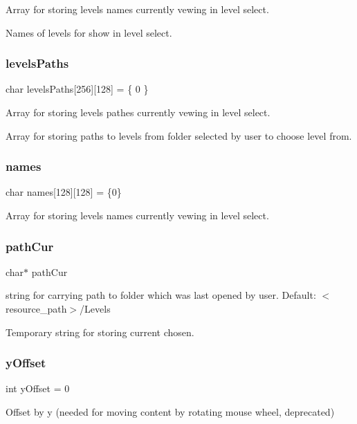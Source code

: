 Array for storing levels names currently vewing in level select. 

Names of levels for show in level select. \mbox{\label{group___main_ga5a00f62db43aff74971290ceba5fa7df}} 
\subsubsection{\texorpdfstring{levels\+Paths}{levelsPaths}}
{\footnotesize\ttfamily char levels\+Paths\mbox{[}256\mbox{]}\mbox{[}128\mbox{]} = \{ 0 \}}



Array for storing levels pathes currently vewing in level select. 

Array for storing paths to levels from folder selected by user to choose level from. \mbox{\label{group___main_ga6341080327d9c3d3ef08fdccd4f05262}} 
\subsubsection{\texorpdfstring{names}{names}}
{\footnotesize\ttfamily char names\mbox{[}128\mbox{]}\mbox{[}128\mbox{]} = \{0\}}



Array for storing levels names currently vewing in level select. 

\mbox{\label{group___main_ga39642f859bbe17ccc6e6d98f84a7cdea}} 
\subsubsection{\texorpdfstring{path\+Cur}{pathCur}}
{\footnotesize\ttfamily char$\ast$ path\+Cur}



string for carrying path to folder which was last opened by user. Default\+: $<$resource\+\_\+path$>$/\+Levels 

Temporary string for storing current chosen. \mbox{\label{group___main_ga016718268d32fcb95b1190cc1071e270}} 
\subsubsection{\texorpdfstring{y\+Offset}{yOffset}}
{\footnotesize\ttfamily int y\+Offset = 0}

Offset by y (needed for moving content by rotating mouse wheel, deprecated) 